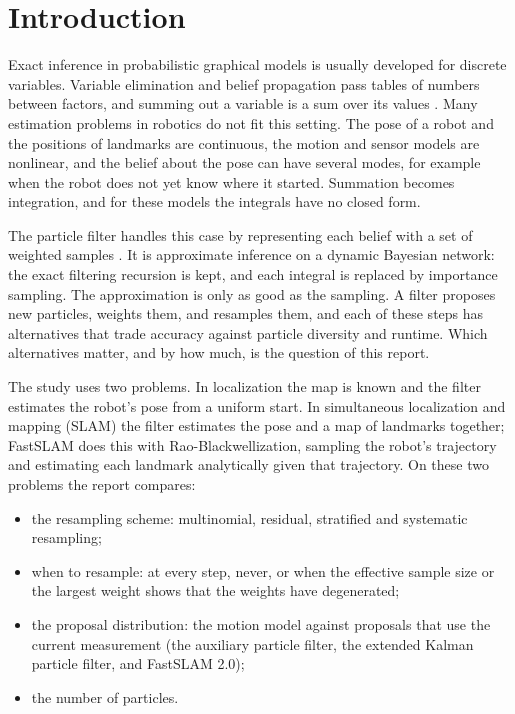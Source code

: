 \section{Introduction}\label{sec:introduction}

Exact inference in probabilistic graphical models is usually developed for discrete variables. Variable
elimination and belief propagation pass tables of numbers between factors, and summing out a variable is a sum
over its values \cite{koller2009probabilistic}. Many estimation problems in robotics do not fit this setting. The
pose of a robot and the positions of landmarks are continuous, the motion and sensor models are nonlinear, and the
belief about the pose can have several modes, for example when the robot does not yet know where it started.
Summation becomes integration, and for these models the integrals have no closed form.

The particle filter handles this case by representing each belief with a set of weighted samples
\cite{gordon1993novel,arulampalam2002tutorial}. It is approximate inference on a dynamic Bayesian network: the
exact filtering recursion is kept, and each integral is replaced by importance sampling. The approximation is only
as good as the sampling. A filter proposes new particles, weights them, and resamples them, and each of these
steps has alternatives that trade accuracy against particle diversity and runtime. Which alternatives matter,
and by how much, is the question of this report.

The study uses two problems. In localization the map is known and the filter estimates the robot's pose from a
uniform start. In simultaneous localization and mapping (SLAM) the filter estimates the pose and a map of
landmarks together; FastSLAM \cite{montemerlo2002fastslam} does this with Rao-Blackwellization, sampling the
robot's trajectory and estimating each landmark analytically given that trajectory. On these two problems the
report compares:
\begin{itemize}
  \item the resampling scheme: multinomial, residual, stratified and systematic resampling;
  \item when to resample: at every step, never, or when the effective sample size or the largest weight shows
        that the weights have degenerated;
  \item the proposal distribution: the motion model against proposals that use the current measurement (the
        auxiliary particle filter, the extended Kalman particle filter, and FastSLAM 2.0);
  \item the number of particles.
\end{itemize}

